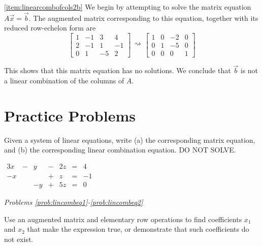 \documentclass{ximera}
\begin{document}
\begin{example}
\begin{explanation}
\ref{item:linearcombofcols2b}   We begin by attempting to solve the matrix equation  $A\vec{x}=\vec{b}$.  The augmented matrix corresponding to this equation, together with its reduced row-echelon form are
$$\left[\begin{array}{ccc|c}  
 1&-1&3&4\\2&-1&1&-1\\0&1&-5&2
 \end{array}\right]\begin{array}{c}
 \\
 \rightsquigarrow\\
 \\
 \end{array}\left[\begin{array}{ccc|c}  
 1&0&-2&0\\0&1&-5&0\\0&0&0&1
 \end{array}\right]$$

This shows that this matrix equation has no solutions.  We conclude that $\vec{b}$ is not a linear combination of the columns of $A$. 

\end{explanation}
\end{example}

\section*{Practice Problems}
 \begin{problem}\label{prob:systomatrixeq}
Given a system of linear equations, write (a) the corresponding matrix equation, and (b) the corresponding linear combination equation.  DO NOT SOLVE.
\begin{center}
$\begin{array}{ccccccc}
       3x&- &y &- &2z&= &4 \\
     -x& & &+ &z&= &-1 \\
     & &-y &+ &5z&=&0
    \end{array}$
\end{center}
\end{problem}

\emph{Problems \ref{prob:lincombeq1}-\ref{prob:lincombeq2}}

Use an augmented matrix and elementary row operations to find coefficients $x_1$ and $x_2$ that make the expression true, or demonstrate that such coefficients do not exist.
\end{document}
